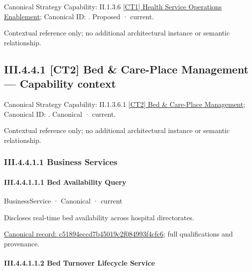 {\small Canonical Strategy Capability: II.1.3.6 \hyperref[element:b13ee2c5a4ef4fd6be8a44795696dfc2]{[CT1] Health Service Operations Enablement}; Canonical ID: \texttt{}. Proposed · current.}\par
Contextual reference only; no additional architectural instance or semantic relationship.\par
\subsection*{III.4.4.1 [CT2] Bed \& Care-Place Management — Capability context}
\label{navigation:III.4.4.1}

{\small Canonical Strategy Capability: II.1.3.6.1 \hyperref[element:f117ccec0bfa4f738e6ddb646b3534a2]{[CT2] Bed \& Care-Place Management}; Canonical ID: \texttt{}. Canonical · current.}\par
Contextual reference only; no additional architectural instance or semantic relationship.\par
\subsubsection*{III.4.4.1.1 Business Services}
\label{navigation:III.4.4.1.1}

\paragraph*{III.4.4.1.1.1 Bed Availability Query}
\label{navigation:III.4.4.1.1.1}

\label{element:c51894eccd7b45019c2f084993f4cfc6}
{\small BusinessService · Canonical · current}\par

Discloses real-time bed availability across hospital directorates.


{\footnotesize \href{../../../../../../../continuum/business/business-service/c51894eccd7b45019c2f084993f4cfc6.md}{Canonical record: c51894eccd7b45019c2f084993f4cfc6}; full qualifications and provenance.}\par
\paragraph*{III.4.4.1.1.2 Bed Turnover Lifecycle Service}
\label{navigation:III.4.4.1.1.2}

